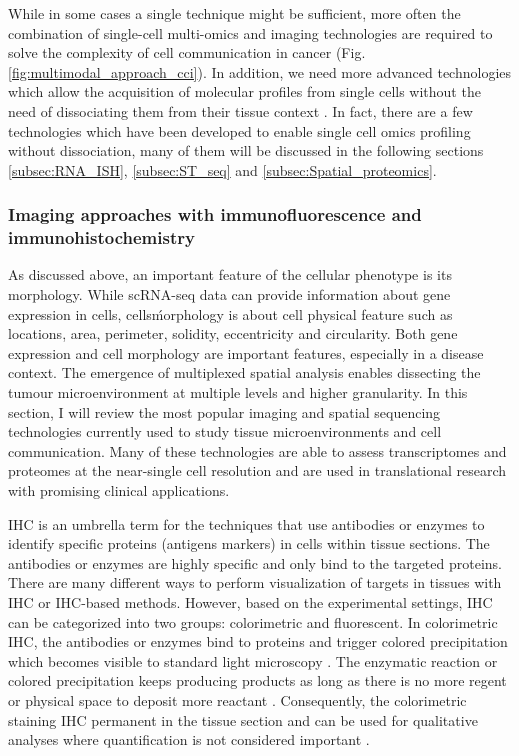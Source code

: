 While in some cases a single technique might be sufficient, more often the combination of single-cell multi-omics and imaging technologies are required to solve the complexity of cell communication in cancer (Fig.\ref{fig:multimodal_approach_cci}). In addition, we need more advanced technologies which allow the acquisition of molecular profiles from single cells without the need of dissociating them from their tissue context \cite{de2020unraveling}. In fact, there are a few technologies which have been developed to enable single cell omics profiling without dissociation, many of them will be discussed in the following sections \ref{subsec:RNA_ISH}, \ref{subsec:ST_seq} and \ref{subsec:Spatial_proteomics}.

\subsubsection{Imaging approaches with immunofluorescence and immunohistochemistry}
As discussed above, an important feature of the cellular phenotype is its morphology. While scRNA-seq data can provide information about gene expression in cells, cells\' morphology is about cell physical feature such as locations, area, perimeter, solidity, eccentricity and circularity. Both gene expression and cell morphology are important features, especially in a disease context. The emergence of multiplexed spatial analysis enables dissecting the tumour microenvironment at multiple levels and higher granularity. In this section, I will review the most popular imaging and spatial sequencing technologies currently used to study tissue microenvironments and cell communication. Many of these technologies are able to assess transcriptomes and proteomes at the near-single cell resolution and are used in translational research with promising clinical applications. 

IHC is an umbrella term for the techniques that use antibodies or enzymes to identify specific proteins (antigens markers) in cells within tissue sections. The antibodies or enzymes are highly specific and only bind to the targeted proteins. There are many different ways to perform visualization of targets in tissues with IHC or IHC-based methods. However, based on the experimental settings, IHC can be categorized into two groups: colorimetric and fluorescent. In colorimetric IHC, the antibodies or enzymes bind to proteins and trigger colored precipitation which becomes visible to standard light microscopy \cite{BOURGEOIS2014132}. The enzymatic reaction or colored precipitation keeps producing products as long as there is no more regent or physical space to deposit more reactant \cite{corthell2014basic}. Consequently, the colorimetric staining IHC permanent in the tissue section and can be used for qualitative analyses where quantification is not considered important \cite{seidal2001interpretation}. 

